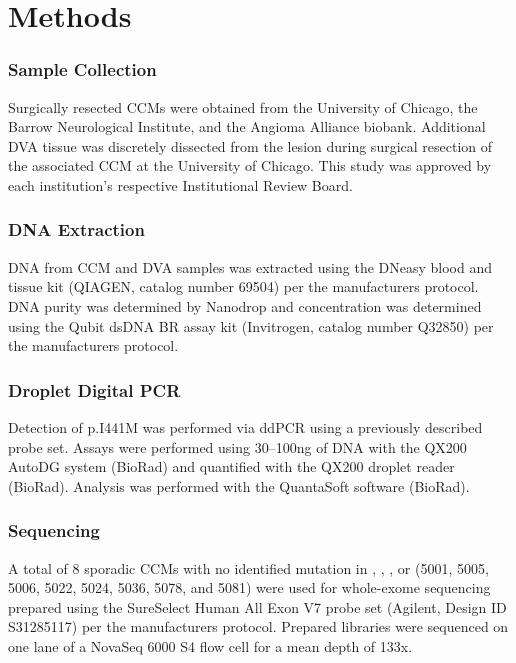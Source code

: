 \section{Methods}
\subsubsection{Sample Collection}
	Surgically resected CCMs were obtained from the University of Chicago, the Barrow Neurological Institute, and the Angioma Alliance biobank. Additional DVA tissue was discretely dissected from the lesion during surgical resection of the associated CCM at the University of Chicago. This study was approved by each institution’s respective Institutional Review Board. 

\subsubsection{DNA Extraction}
	DNA from CCM and DVA samples was extracted using the DNeasy blood and tissue kit (QIAGEN, catalog number 69504) per the manufacturers protocol. DNA purity was determined by Nanodrop and concentration was determined using the Qubit dsDNA BR assay kit (Invitrogen, catalog number Q32850) per the manufacturers protocol. 

\subsubsection{Droplet Digital PCR}
Detection of  p.I441M was performed via ddPCR using a previously described probe set\citep{couto2015}. Assays were performed using 30--100ng of DNA with the QX200 AutoDG system (BioRad) and quantified with the QX200 droplet reader (BioRad). Analysis was performed with the QuantaSoft software (BioRad). 

\subsubsection{Sequencing}
	A total of 8 sporadic CCMs with no identified mutation in , , , or  (5001, 5005, 5006, 5022, 5024, 5036, 5078, and 5081) were used for whole-exome sequencing prepared using the SureSelect Human All Exon V7 probe set (Agilent, Design ID S31285117) per the manufacturers protocol. Prepared libraries were sequenced on one lane of a NovaSeq 6000 S4 flow cell for a mean depth of 133x. 

